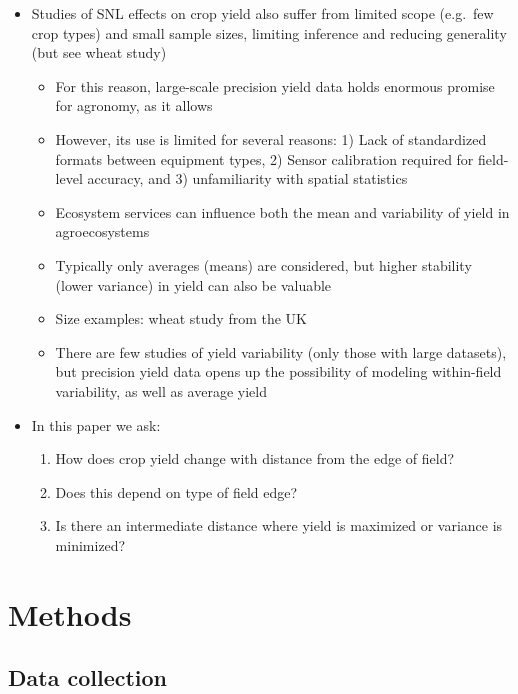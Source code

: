 \documentclass[]{elsarticle} %
\providecommand{\tightlist}{%
  \setlength{\itemsep}{0pt}\setlength{\parskip}{0pt}}
\begin{document}
\begin{itemize}
\tightlist
\item
  Studies of SNL effects on crop yield also suffer from limited scope (e.g.~few crop types) and small sample sizes, limiting inference and reducing generality (but see wheat study)

  \begin{itemize}
  \tightlist
  \item
    For this reason, large-scale precision yield data holds enormous promise for agronomy, as it allows
  \item
    However, its use is limited for several reasons: 1) Lack of standardized formats between equipment types, 2) Sensor calibration required for field-level accuracy, and 3) unfamiliarity with spatial statistics
  \item
    Ecosystem services can influence both the mean and variability of yield in agroecosystems
  \item
    Typically only averages (means) are considered, but higher stability (lower variance) in yield can also be valuable
  \item
    Size examples: wheat study from the UK
  \item
    There are few studies of yield variability (only those with large datasets), but precision yield data opens up the possibility of modeling within-field variability, as well as average yield
  \end{itemize}
\item
  In this paper we ask:

  \begin{enumerate}
  \def\labelenumi{\arabic{enumi}.}
  \tightlist
  \item
    How does crop yield change with distance from the edge of field?
  \item
    Does this depend on type of field edge?
  \item
    Is there an intermediate distance where yield is maximized or variance is minimized?
  \end{enumerate}
\end{itemize}

\hypertarget{methods}{%
\section{Methods}\label{methods}}

\hypertarget{data-collection}{%
\subsection{Data collection}\label{data-collection}}
\end{document}
